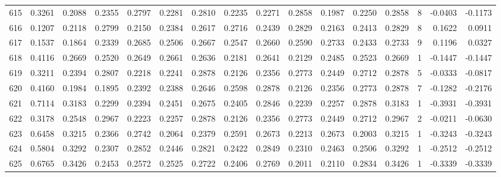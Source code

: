 \begin{tabular}{lrrrrrrrrrrrrrrr}
615 &      0.3261 &  0.2088 &  0.2355 &  0.2797 &  0.2281 &  0.2810 &  0.2235 &  0.2271 &  0.2858 &  0.1987 &   0.2250 &     0.2858 &      8 &                   -0.0403 &                    -0.1173 \\
616 &      0.1207 &  0.2118 &  0.2799 &  0.2150 &  0.2384 &  0.2617 &  0.2716 &  0.2439 &  0.2829 &  0.2163 &   0.2413 &     0.2829 &      8 &                    0.1622 &                     0.0911 \\
617 &      0.1537 &  0.1864 &  0.2339 &  0.2685 &  0.2506 &  0.2667 &  0.2547 &  0.2660 &  0.2590 &  0.2733 &   0.2433 &     0.2733 &      9 &                    0.1196 &                     0.0327 \\
618 &      0.4116 &  0.2669 &  0.2520 &  0.2649 &  0.2661 &  0.2636 &  0.2181 &  0.2641 &  0.2129 &  0.2485 &   0.2523 &     0.2669 &      1 &                   -0.1447 &                    -0.1447 \\
619 &      0.3211 &  0.2394 &  0.2807 &  0.2218 &  0.2241 &  0.2878 &  0.2126 &  0.2356 &  0.2773 &  0.2449 &   0.2712 &     0.2878 &      5 &                   -0.0333 &                    -0.0817 \\
620 &      0.4160 &  0.1984 &  0.1895 &  0.2392 &  0.2388 &  0.2646 &  0.2598 &  0.2878 &  0.2126 &  0.2356 &   0.2773 &     0.2878 &      7 &                   -0.1282 &                    -0.2176 \\
621 &      0.7114 &  0.3183 &  0.2299 &  0.2394 &  0.2451 &  0.2675 &  0.2405 &  0.2846 &  0.2239 &  0.2257 &   0.2878 &     0.3183 &      1 &                   -0.3931 &                    -0.3931 \\
622 &      0.3178 &  0.2548 &  0.2967 &  0.2223 &  0.2257 &  0.2878 &  0.2126 &  0.2356 &  0.2773 &  0.2449 &   0.2712 &     0.2967 &      2 &                   -0.0211 &                    -0.0630 \\
623 &      0.6458 &  0.3215 &  0.2366 &  0.2742 &  0.2064 &  0.2379 &  0.2591 &  0.2673 &  0.2213 &  0.2673 &   0.2003 &     0.3215 &      1 &                   -0.3243 &                    -0.3243 \\
624 &      0.5804 &  0.3292 &  0.2307 &  0.2852 &  0.2446 &  0.2821 &  0.2422 &  0.2849 &  0.2310 &  0.2463 &   0.2506 &     0.3292 &      1 &                   -0.2512 &                    -0.2512 \\
625 &      0.6765 &  0.3426 &  0.2453 &  0.2572 &  0.2525 &  0.2722 &  0.2406 &  0.2769 &  0.2011 &  0.2110 &   0.2834 &     0.3426 &      1 &                   -0.3339 &                    -0.3339 \\

\end{tabular}
